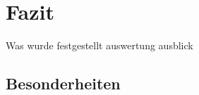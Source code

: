 \chapter{Fazit}%

\label{cha:Fazit}

Was wurde festgestellt
auswertung ausblick

\section{Besonderheiten}

